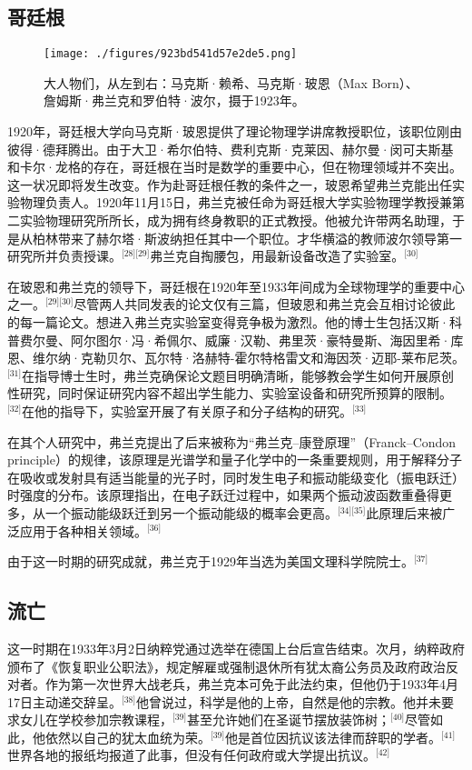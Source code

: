 \subsection{哥廷根}
\begin{figure}[ht]
\centering
\texttt{[image: ./figures/923bd541d57e2de5.png]}
\caption{大人物们，从左到右：马克斯·赖希、马克斯·玻恩（Max Born）、詹姆斯·弗兰克和罗伯特·波尔，摄于1923年。} \label{fig_ZMSflk_2}
\end{figure}
1920年，哥廷根大学向马克斯·玻恩提供了理论物理学讲席教授职位，该职位刚由彼得·德拜腾出。由于大卫·希尔伯特、费利克斯·克莱因、赫尔曼·闵可夫斯基和卡尔·龙格的存在，哥廷根在当时是数学的重要中心，但在物理领域并不突出。这一状况即将发生改变。作为赴哥廷根任教的条件之一，玻恩希望弗兰克能出任实验物理负责人。1920年11月15日，弗兰克被任命为哥廷根大学实验物理学教授兼第二实验物理研究所所长，成为拥有终身教职的正式教授。他被允许带两名助理，于是从柏林带来了赫尔塔·斯波纳担任其中一个职位。才华横溢的教师波尔领导第一研究所并负责授课。\(^\text{[28][29]}\)弗兰克自掏腰包，用最新设备改造了实验室。\(^\text{[30]}\)

在玻恩和弗兰克的领导下，哥廷根在1920年至1933年间成为全球物理学的重要中心之一。\(^\text{[29][30]}\)尽管两人共同发表的论文仅有三篇，但玻恩和弗兰克会互相讨论彼此的每一篇论文。想进入弗兰克实验室变得竞争极为激烈。他的博士生包括汉斯·科普费尔曼、阿尔图尔·冯·希佩尔、威廉·汉勒、弗里茨·豪特曼斯、海因里希·库恩、维尔纳·克勒贝尔、瓦尔特·洛赫特-霍尔特格雷文和海因茨·迈耶-莱布尼茨。\(^\text{[31]}\)在指导博士生时，弗兰克确保论文题目明确清晰，能够教会学生如何开展原创性研究，同时保证研究内容不超出学生能力、实验室设备和研究所预算的限制。\(^\text{[32]}\)在他的指导下，实验室开展了有关原子和分子结构的研究。\(^\text{[33]}\)

在其个人研究中，弗兰克提出了后来被称为“弗兰克–康登原理”（Franck–Condon principle）的规律，该原理是光谱学和量子化学中的一条重要规则，用于解释分子在吸收或发射具有适当能量的光子时，同时发生电子和振动能级变化（振电跃迁）时强度的分布。该原理指出，在电子跃迁过程中，如果两个振动波函数重叠得更多，从一个振动能级跃迁到另一个振动能级的概率会更高。\(^\text{[34][35]}\)此原理后来被广泛应用于各种相关领域。\(^\text{[36]}\)

由于这一时期的研究成就，弗兰克于1929年当选为美国文理科学院院士。\(^\text{[37]}\)
\subsection{流亡}
这一时期在1933年3月2日纳粹党通过选举在德国上台后宣告结束。次月，纳粹政府颁布了《恢复职业公职法》，规定解雇或强制退休所有犹太裔公务员及政府政治反对者。作为第一次世界大战老兵，弗兰克本可免于此法约束，但他仍于1933年4月17日主动递交辞呈。\(^\text{[38]}\)他曾说过，科学是他的上帝，自然是他的宗教。他并未要求女儿在学校参加宗教课程，\(^\text{[39]}\)甚至允许她们在圣诞节摆放装饰树；\(^\text{[40]}\)尽管如此，他依然以自己的犹太血统为荣。\(^\text{[39]}\)他是首位因抗议该法律而辞职的学者。\(^\text{[41]}\)世界各地的报纸均报道了此事，但没有任何政府或大学提出抗议。\(^\text{[42]}\)

